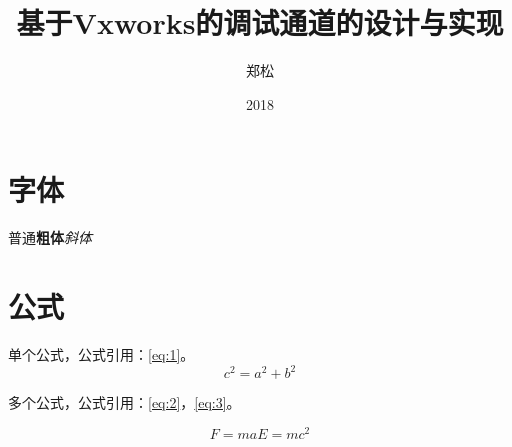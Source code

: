 \documentclass[format=draft,language=chinese,degree=master]{hustthesis}
\title{基于Vxworks的调试通道的设计与实现}{A design and implementation of debug channel based on Vxworks.}
\author{郑松}{Joe}
\date{2018}{3}{26}
\begin{document}
\frontmatter

\maketitle

\makeabstract

\tableofcontents


\mainmatter
\clearpage




\section{字体}

普通\textbf{粗体}\emph{斜体}


\section{公式}

单个公式，公式引用：\autoref{eq:1}。
\begin{equation}
 c^2 = a^2 + b^2 \label{eq:1}
\end{equation}

多个公式，公式引用：\autoref{eq:2}，\autoref{eq:3}。

\begin{subequations}
\begin{equation}
  F = ma \label{eq:2}
\end{equation}
\begin{equation}
  E = mc^2 \label{eq:3}
\end{equation}
\end{subequations}
\end{document}
